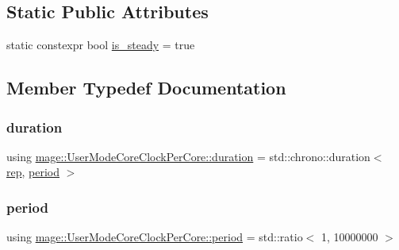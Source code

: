 \subsection*{Static Public Attributes}
\begin{DoxyCompactItemize}
\item 
static constexpr bool \hyperlink{structmage_1_1_user_mode_core_clock_per_core_ae41f27cabafd1e7d5b703d3ebf32a97d}{is\+\_\+steady} = true
\end{DoxyCompactItemize}


\subsection{Member Typedef Documentation}
\hypertarget{structmage_1_1_user_mode_core_clock_per_core_a55aa3108b2d755c6b8df89ba37585fbb}{}\label{structmage_1_1_user_mode_core_clock_per_core_a55aa3108b2d755c6b8df89ba37585fbb} 
\subsubsection{\texorpdfstring{duration}{duration}}
{\footnotesize\ttfamily using \hyperlink{structmage_1_1_user_mode_core_clock_per_core_a55aa3108b2d755c6b8df89ba37585fbb}{mage\+::\+User\+Mode\+Core\+Clock\+Per\+Core\+::duration} =  std\+::chrono\+::duration$<$ \hyperlink{structmage_1_1_user_mode_core_clock_per_core_a287b38a7811aa8bb1a1829ac316acd09}{rep}, \hyperlink{structmage_1_1_user_mode_core_clock_per_core_ad34694d282d2fdbdf1f09b4a49ae7416}{period} $>$}

\hypertarget{structmage_1_1_user_mode_core_clock_per_core_ad34694d282d2fdbdf1f09b4a49ae7416}{}\label{structmage_1_1_user_mode_core_clock_per_core_ad34694d282d2fdbdf1f09b4a49ae7416} 
\subsubsection{\texorpdfstring{period}{period}}
{\footnotesize\ttfamily using \hyperlink{structmage_1_1_user_mode_core_clock_per_core_ad34694d282d2fdbdf1f09b4a49ae7416}{mage\+::\+User\+Mode\+Core\+Clock\+Per\+Core\+::period} =  std\+::ratio$<$ 1, 10\textquotesingle{}000\textquotesingle{}000 $>$}


